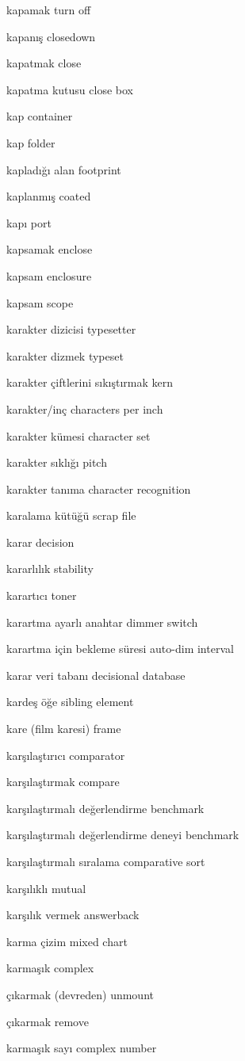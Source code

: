 \documentclass[12pt,fleqn]{article}\usepackage{../../common}
\begin{document}
kapamak turn off

kapanış closedown

kapatmak close

kapatma kutusu close box

kap container

kap folder

kapladığı alan footprint

kaplanmış coated

kapı port

kapsamak enclose

kapsam enclosure

kapsam scope

karakter dizicisi typesetter

karakter dizmek typeset

karakter çiftlerini sıkıştırmak kern

karakter/inç characters per inch

karakter kümesi character set

karakter sıklığı pitch

karakter tanıma character recognition

karalama kütüğü scrap file

karar decision

kararlılık stability

karartıcı toner

karartma ayarlı anahtar dimmer switch

karartma için bekleme süresi auto-dim interval

karar veri tabanı decisional database

kardeş öğe sibling element

kare (film karesi) frame

karşılaştırıcı comparator

karşılaştırmak compare

karşılaştırmalı değerlendirme benchmark

karşılaştırmalı değerlendirme deneyi benchmark

karşılaştırmalı sıralama comparative sort

karşılıklı mutual

karşılık vermek answerback

karma çizim mixed chart

karmaşık complex

çıkarmak (devreden) unmount

çıkarmak remove

karmaşık sayı complex number
\end{document}
